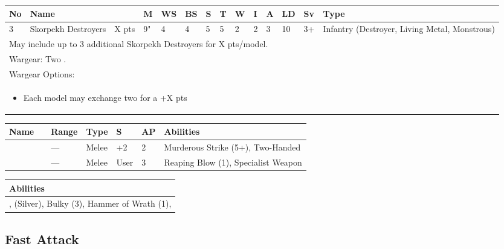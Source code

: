 \noindent
\begin{tabular}{||m{10pt} m{90pt} m{30pt} m{11pt} m{11pt} m{11pt} m{11pt} m{11pt} m{11pt} m{11pt} m{11pt} m{11pt} m{11pt} m{135pt}||}
	\hline
	No & Name & & M & WS & BS & S & T & W & I & A & LD & Sv & Type \\
	\hline
	3 & Skorpekh Destroyers & X pts & 9" & 4 & 4 & 5 & 5 & 2 & 2 & 3 & 10 & 3+ & Infantry (Destroyer, Living Metal, Monstrous) \\
	\hline
	\hline
	\multicolumn{14}{||Z{532 pt}||}{May include up to 3 additional Skorpekh Destroyers for X pts/model.}\\	
	\hline
	\hline
	\multicolumn{14}{||Z{532 pt}||}{Wargear: Two \quickref{Hyperphase Thresher}.} \\
	\multicolumn{14}{||Z{532 pt}||}{Wargear Options:} \\	\multicolumn{14}{||Z{532 pt}||}{\begin{itemize}
			\item Each model may exchange two \quickref{Hyperphase Thresher} for a \quickref{Hyperphase Reap-Blade} \hrulefill +X pts
	\end{itemize}} \\
	\hline
\end{tabular}

\noindent
\begin{tabular}{||m{110pt} m{30pt} m{31pt} m{55pt} m{12pt} m{12pt} m{210pt}||}
	\hline
	Name & & Range & Type & S & AP & Abilities \\
	\hline
	\quickref{Hyperphase Reap-Blade} &  & — & Melee & +2 & 2 & Murderous Strike (5+), Two-Handed \\
	\quickref{Hyperphase Thresher} &  & — & Melee & User & 3 & Reaping Blow (1), Specialist Weapon \\
	\hline
\end{tabular}

\noindent
\begin{tabular}{||m{532pt}||}
	\hline
	Abilities \\
	\hline
	\quickref{Annihilation Protocols}, \quickref{Awakening Protocols} (Silver), Bulky (3), Hammer of Wrath (1), \quickref{Reanimation Protocols} \\
	\hline
\end{tabular}



\newpage
\subsection{Fast Attack}


